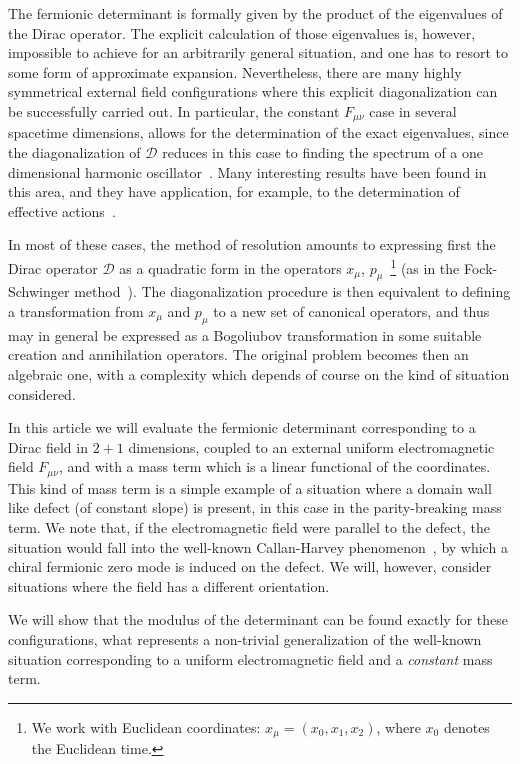 \documentclass[a4paper,12pt]{article}
\begin{document}
The fermionic determinant is formally given by the product of the
eigenvalues of the Dirac operator. The explicit calculation of those
eigenvalues is, however, impossible to achieve for an arbitrarily
general situation, and one has to resort to some form of approximate
expansion.  Nevertheless, there are many highly symmetrical external
field configurations where this explicit diagonalization can be
successfully carried out.  In particular, the constant $F_{\mu\nu}$ case
in several spacetime dimensions, allows for the determination of the
exact eigenvalues, since the diagonalization of ${\mathcal D}$ reduces
in this case to finding the spectrum of a one dimensional harmonic
oscillator~\cite{schw}. Many interesting results have been found in
this area, and they have application, for example, to the
determination of effective actions~\cite{eff}.

In most of these cases, the method of resolution amounts to expressing
first the Dirac operator ${\mathcal D}$ as a quadratic form in the
operators $x_\mu$, $p_\mu$~\footnote{We work with Euclidean coordinates:
  $x_\mu=(x_0, x_1, x_2)$, where $x_0$ denotes the Euclidean time.} (as
in the Fock-Schwinger method~\cite{schw}).  The diagonalization
procedure is then equivalent to defining a transformation from $x_\mu$
and $p_\mu$ to a new set of canonical operators, and thus may in general
be expressed as a Bogoliubov transformation in some suitable creation
and annihilation operators.  The original problem becomes then an
algebraic one, with a complexity which depends of course on the kind
of situation considered.

In this article we will evaluate the fermionic determinant
corresponding to a Dirac field in $2+1$ dimensions, coupled to an
external uniform electromagnetic field $F_{\mu\nu}$, and with a mass term
which is a linear functional of the coordinates. This kind of mass
term is a simple example of a situation where a domain wall like
defect (of constant slope) is present, in this case in the
parity-breaking mass term. We note that, if the electromagnetic field
were parallel to the defect, the situation would fall into the
well-known Callan-Harvey phenomenon~\cite{callan}, by which a chiral
fermionic zero mode is induced on the defect. We will, however,
consider situations where the field has a different orientation.

We will show that the modulus of the determinant can be found exactly
for these configurations, what represents a non-trivial generalization
of the well-known situation corresponding to a uniform electromagnetic
field and a {\em constant\/} mass term.
\end{document}
